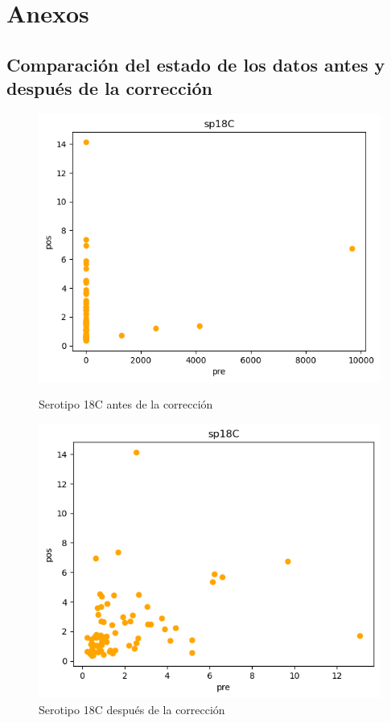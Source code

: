 \chapter*{Anexos}\label{chapter:anexos}

\section*{Comparación del estado de los datos antes y después de la corrección}
\label{comp}
\begin{figure}[h]
    \centering
    \begin{minipage}{0.45\textwidth}
        \centering
        \includegraphics[width=\linewidth]{Graphics/sp18cd.png}
        \caption{Serotipo 18C antes de la corrección}
        \label{fig:sp18cd}
    \end{minipage}%
    \hfill
    \begin{minipage}{0.45\textwidth}
        \centering
        \includegraphics[width=\linewidth]{Graphics/sp18cc.png}
        \caption{Serotipo 18C después de la corrección}
        \label{fig:sp18c}
    \end{minipage}

\end{figure}

